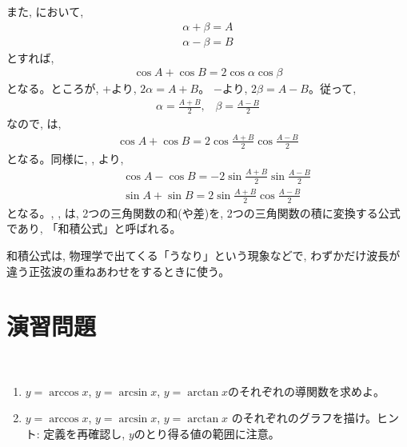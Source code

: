 また, において, 
\begin{eqnarray}
\alpha+\beta=A\label{eq:alphabetaAB1}\\
\alpha-\beta=B\label{eq:alphabetaAB2}
\end{eqnarray}
とすれば, 
\begin{eqnarray}
\cos A+\cos B=2\cos\alpha \cos\beta\label{eq:waseki15}
\end{eqnarray}
となる。ところが, +より, $2\alpha=A+B$。
$-$より, $2\beta=A-B$。従って, 
\begin{eqnarray*}
\alpha=\frac{A+B}{2},\,\,\,\,\,
\beta=\frac{A-B}{2}
\end{eqnarray*}
なので, は, 
\begin{eqnarray}
\cos A + \cos B = 2\cos\frac{A+B}{2} \cos\frac{A-B}{2}\label{eq:waseki17}
\end{eqnarray}
となる。同様に, , より, 
\begin{eqnarray}
&&\cos A - \cos B = -2\sin\frac{A+B}{2} \sin\frac{A-B}{2}\label{eq:waseki27}\\
&&\sin A + \sin B = 2\sin\frac{A+B}{2} \cos\frac{A-B}{2}\label{eq:waseki37}
\end{eqnarray}
となる。, , は, 2つの三角関数の和(や差)を, 
2つの三角関数の積に変換する公式であり, 「和積公式」と呼ばれる。
\mv

和積公式は, 物理学で出てくる「うなり」という現象などで, 
わずかだけ波長が違う正弦波の重ねあわせをするときに使う。\hv


\section*{演習問題}
\mv

\begin{exq}\label{q:trig_arcgraph} 　
\begin{enumerate}
\item $y=\arccos x$, $y=\arcsin x$, $y=\arctan x$のそれぞれの導関数を求めよ。
\item $y=\arccos x$, $y=\arcsin x$, $y=\arctan x$
のそれぞれのグラフを描け。ヒント: 定義を再確認し, $y$のとり得る値の範囲に注意。
\end{enumerate}
\end{exq}
\mv

